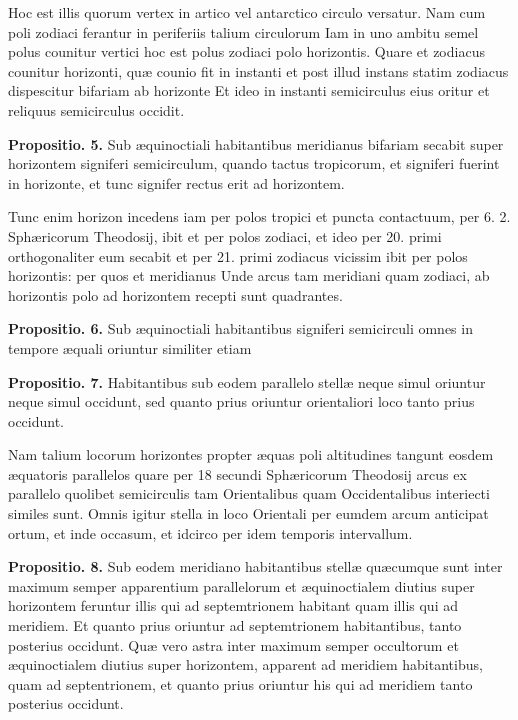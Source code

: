 \documentclass[11pt,a4paper]{article}
\begin{document}
Hoc est illis quorum vertex in artico vel antarctico circulo versatur. Nam cum poli zodiaci ferantur in periferiis talium circulorum Iam in uno ambitu semel polus counitur vertici hoc est polus zodiaci polo horizontis. Quare et zodiacus counitur horizonti, quæ counio fit in instanti et post illud instans statim zodiacus dispescitur bifariam ab horizonte Et ideo in instanti semicirculus eius oritur et reliquus semicirculus occidit.

\textbf{Propositio. 5.} Sub æquinoctiali habitantibus meridianus bifariam secabit super horizontem signiferi semicirculum, quando tactus tropicorum, et signiferi fuerint in horizonte, et tunc signifer rectus erit ad horizontem.

Tunc enim horizon incedens iam per polos tropici et puncta contactuum, per 6. 2. Sphæricorum Theodosij, ibit et per polos zodiaci, et ideo per 20. primi orthogonaliter eum secabit et per 21. primi zodiacus vicissim ibit per polos horizontis: per quos et meridianus Unde arcus tam meridiani quam zodiaci, ab horizontis polo ad horizontem recepti sunt quadrantes.

\textbf{Propositio. 6.} Sub æquinoctiali habitantibus signiferi semicirculi omnes in tempore æquali oriuntur similiter etiam


\textbf{Propositio. 7.} Habitantibus sub eodem parallelo stellæ neque simul oriuntur neque simul occidunt, sed quanto prius oriuntur orientaliori loco tanto prius occidunt.

Nam talium locorum horizontes propter æquas poli altitudines tangunt eosdem æquatoris parallelos quare per 18 secundi Sphæricorum Theodosij arcus ex parallelo quolibet semicirculis tam Orientalibus quam Occidentalibus interiecti similes sunt. Omnis igitur stella in loco Orientali per eumdem arcum anticipat ortum, et inde occasum, et idcirco per idem temporis intervallum.

\textbf{Propositio. 8.} Sub eodem meridiano habitantibus stellæ quæcumque sunt inter maximum semper apparentium parallelorum et æquinoctialem diutius super horizontem feruntur illis qui ad septemtrionem habitant quam illis qui ad meridiem. Et quanto prius oriuntur ad septemtrionem habitantibus, tanto posterius occidunt. Quæ vero astra inter maximum semper occultorum et æquinoctialem diutius super horizontem, apparent ad meridiem habitantibus, quam ad septentrionem, et quanto prius oriuntur his qui ad meridiem tanto posterius occidunt.
\end{document}
